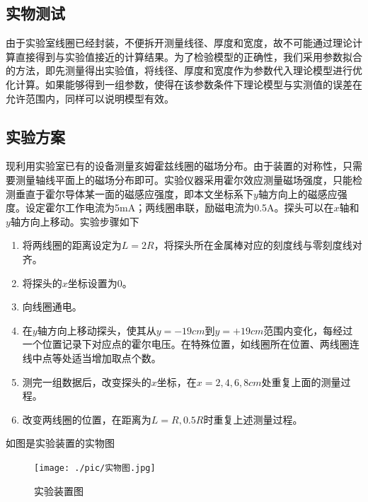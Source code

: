 \documentclass{ctexart}
\begin{document}
\begin{multicols}{2}
\section{实物测试}
由于实验室线圈已经封装，不便拆开测量线径、厚度和宽度，故不可能通过理论计算直接得到与实验值接近的计算结果。为了检验模型的正确性，我们采用参数拟合的方法，即先测量得出实验值，将线径、厚度和宽度作为参数代入理论模型进行优化计算。如果能够得到一组参数，使得在该参数条件下理论模型与实测值的误差在允许范围内，同样可以说明模型有效。
\subsection{实验方案}
现利用实验室已有的设备测量亥姆霍兹线圈的磁场分布。由于装置的对称性，只需要测量轴线平面上的磁场分布即可。实验仪器采用霍尔效应测量磁场强度，只能检测垂直于霍尔导体某一面的磁感应强度，即本文坐标系下$y$轴方向上的磁感应强度。设定霍尔工作电流为5mA；两线圈串联，励磁电流为0.5A。探头可以在$x$轴和$y$轴方向上移动。实验步骤如下
\begin{enumerate}
    \item 将两线圈的距离设定为$L=2R$，将探头所在金属棒对应的刻度线与零刻度线对齐。
    \item 将探头的$x$坐标设置为0。
    \item 向线圈通电。
    \item 在$y$轴方向上移动探头，使其从$y=-19cm$到$y=+19cm$范围内变化，每经过一个位置记录下对应点的霍尔电压。在特殊位置，如线圈所在位置、两线圈连线中点等处适当增加取点个数。
    \item 测完一组数据后，改变探头的$x$坐标，在$x=2,4,6,8cm$处重复上面的测量过程。
    \item 改变两线圈的位置，在距离为$L=R,0.5R$时重复上述测量过程。
\end{enumerate}
如图是实验装置的实物图
\begin{figure}[H]
    \centering
    \texttt{[image: ./pic/实物图.jpg]}
    \caption{实验装置图}
    \label{截面}
\end{figure}

\end{multicols}
\end{document}
